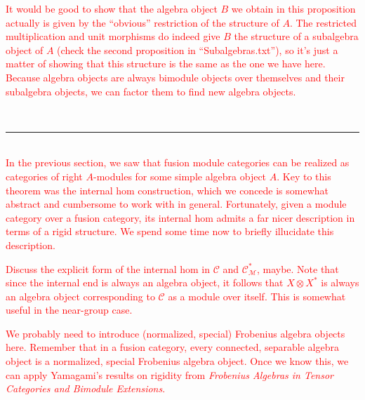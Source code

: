 \documentclass[12pt, reqno]{amsart}
\makeatletter
\def\subsection{\@startsection{subsection}{2}\z@{0pt}{0.5\linespacing}{\large}}
\numberwithin{equation}{section}
\theoremstyle{plainspace}
\theoremstyle{definitionspace}
\theoremstyle{remarkspace}
\newcommand{\sectionbar}[4]{
	\noindent\\[#3\linespacing] \rule{#1\linewidth}{#2} \\[#4\linespacing]
}
\newcommand{\mathcat}[1]{\mathcal{#1}}
\makeatother
\begin{document}
\noindent \textcolor{red}{It would be good to show that the algebra object $B$ we obtain in this proposition actually is given by the ``obvious'' restriction of the structure of $A$. The restricted multiplication and unit morphisms do indeed give $B$ the structure of a subalgebra object of $A$ (check the second proposition in ``Subalgebras.txt''), so it's just a matter of showing that this structure is the same as the one we have here. Because algebra objects are always bimodule objects over themselves and their subalgebra objects, we can factor them to find new algebra objects.}
\newline\newline


\subsection{The Bimodule Bicategory}\label{sec:bimodule_bicategory}
\sectionbar{1}{1pt}{-2}{0}

\noindent \textcolor{red}{In the previous section, we saw that fusion module categories can be realized as categories of right $A$-modules for some simple algebra object $A$. Key to this theorem was the internal hom construction, which we concede is somewhat abstract and cumbersome to work with in general. Fortunately, given a module category over a fusion category, its internal hom admits a far nicer description in terms of a rigid structure. We spend some time now to briefly illucidate this description.}
\newline

\noindent \textcolor{red}{Discuss the explicit form of the internal hom in $\mathcat{C}$ and $\mathcat{C}_{\mathcat{M}}^{*}$, maybe. Note that since the internal end is always an algebra object, it follows that $X \otimes X^{*}$ is always an algebra object corresponding to $\mathcat{C}$ as a module over itself. This is somewhat useful in the near-group case.}
\newline

\noindent \textcolor{red}{We probably need to introduce (normalized, special) Frobenius algebra objects here. Remember that in a fusion category, every connected, separable algebra object is a normalized, special Frobenius algebra object. Once we know this, we can apply Yamagami's results on rigidity from {\em Frobenius Algebras in Tensor Categories and Bimodule Extensions}.}
\newline
\end{document}
